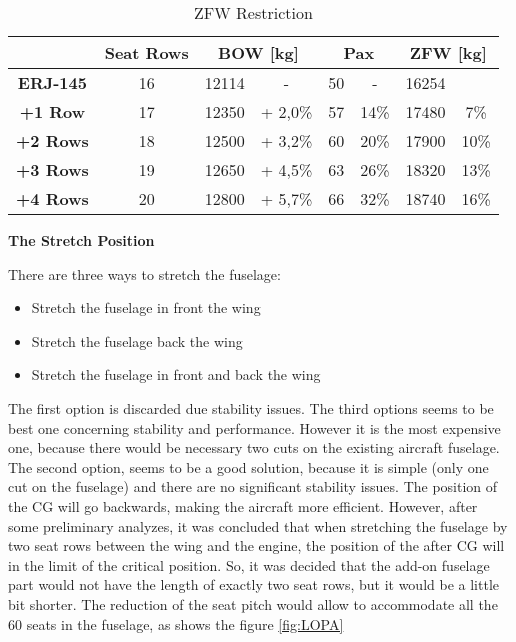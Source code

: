 \begin{table}[htbp]
  \centering
  \caption{ZFW Restriction}
    \begin{tabular}{cccccccr}
    \toprule
          & \textbf{Seat Rows} & \multicolumn{2}{c}{\textbf{BOW [kg]}} & \multicolumn{2}{c}{\textbf{Pax}} & \multicolumn{2}{c}{\textbf{ZFW [kg]}} \\
    \midrule
    \textbf{ERJ-145} & 16    & 12114 & -     & 50    & -     & 16254 &  \\
    \textbf{+1 Row} & 17    & 12350 & + 2,0\% & 57    & 14\%  & 17480 & \multicolumn{1}{c}{7\%} \\
    \textbf{+2 Rows} & 18    & 12500 & + 3,2\% & 60    & 20\%  & 17900 & \multicolumn{1}{c}{10\%} \\
    \textbf{+3 Rows} & 19    & 12650 & + 4,5\% & 63    & 26\%  & 18320 & \multicolumn{1}{c}{13\%} \\
    \textbf{+4 Rows} & 20    & 12800 & + 5,7\% & 66    & 32\%  & 18740 & \multicolumn{1}{c}{16\%} \\
    \bottomrule
    \end{tabular}%
  \label{tab:ZFWRestriction}%
\end{table}%



\textbf{The Stretch Position}

There are three ways to stretch the fuselage:

\begin{itemize}
  \item Stretch the fuselage in front the wing
  \item Stretch the fuselage back the wing
  \item Stretch the fuselage in front and back the wing
\end{itemize}


The first option is discarded due stability issues.
The third options seems to be best one concerning stability and performance. However it is the most expensive one, because there would be necessary two cuts on the existing aircraft fuselage.
The second option, seems to be a good solution, because it is simple (only one cut on the fuselage) and there are no significant stability issues. The position of the CG will go backwards, making the aircraft more efficient. However, after some preliminary analyzes, it was concluded that when stretching the fuselage by two seat rows between the wing and the engine, the position of the after CG will in the limit of the critical position. So, it was decided that the add-on fuselage part would not have the length of exactly two seat rows, but it would be a little bit shorter. The reduction of the seat pitch would allow to accommodate all the 60 seats in the fuselage, as shows the figure \ref{fig:LOPA}
